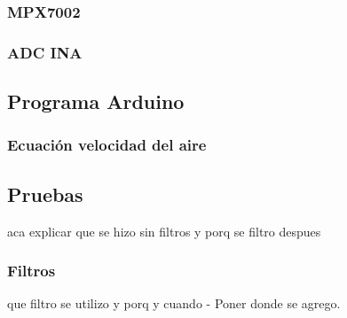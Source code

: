 	
		
		
	
	\subsubsection{MPX7002}
    \subsubsection{ADC INA}

    \subsection{Programa Arduino}
        \subsubsection{Ecuación velocidad del aire}
    \subsection{Pruebas}
    aca explicar que se hizo sin filtros y porq se filtro despues
        \subsubsection{Filtros}
        que filtro se utilizo y porq y cuando
    - Poner donde se agrego.

\newpage